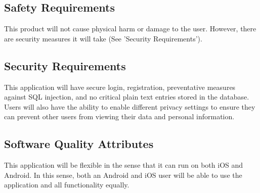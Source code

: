 \documentclass[letterpaper, 10, draftclsnofoot, onecolumn]{IEEEtran}
\begin{document}
\subsection{Safety Requirements}
This product will not cause physical harm or damage to the user. However, there are security measures it will take (See 'Security Requirements').

\subsection{Security Requirements}
This application will have secure login, registration, preventative measures against SQL injection, and no critical plain text entries stored in the database. Users will also have the ability to enable different privacy settings to ensure they can prevent other users from viewing their data and personal information. 

\subsection{Software Quality Attributes}
This application will be flexible in the sense that it can run on both iOS and Android. In this sense, both an Android and iOS user will be able to use the application and all functionality equally. 

\end{document}
